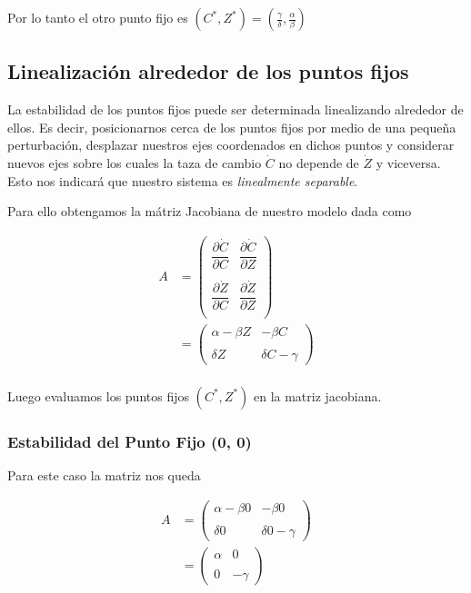 \documentclass[10pt,journal,compsoc]{IEEEtran}
\begin{document}
 Por lo tanto el otro punto fijo es $(C^{*}, Z^{*}) = (\frac{\gamma}{\delta},
 \frac{\alpha}{\beta})$

 \subsection{Linealización alrededor de los puntos fijos}

 La estabilidad de los puntos fijos puede ser determinada linealizando alrededor
 de ellos. Es decir, posicionarnos cerca de los puntos fijos por medio de una
 pequeña perturbación, desplazar nuestros ejes coordenados en dichos puntos y
 considerar nuevos ejes sobre los cuales la taza de cambio $\dot C$ no depende
 de $\dot Z$ y viceversa. Esto nos indicará que nuestro sistema es
 \textit{linealmente separable}.

 Para ello obtengamos la mátriz Jacobiana de nuestro modelo dada como

 \begin{equation*}
  \begin{aligned}
  A &= 
    \begin{pmatrix}
      \dfrac{\partial \dot C}{\partial C} & \dfrac{\partial \dot C}{\partial Z}\\
      & \\
      \dfrac{\partial \dot Z}{\partial C} & \dfrac{\partial \dot Z}{\partial Z} \\
    \end{pmatrix} \\
    &= \begin{pmatrix}
      \alpha - \beta Z & -\beta C\\
      & \\
      \delta Z & \delta C - \gamma
    \end{pmatrix} \\
  \end{aligned}
 \end{equation*}
 
 Luego evaluamos los puntos fijos $(C^{*}, Z^{*})$ en la matriz jacobiana.

 \subsubsection{Estabilidad del Punto Fijo (0, 0)}

 Para este caso la matriz nos queda
 
 \begin{equation*}
  \begin{aligned}
  A &= \begin{pmatrix}
      \alpha - \beta 0 & -\beta 0\\
      & \\
      \delta 0 & \delta 0 - \gamma
    \end{pmatrix} \\
    &= \begin{pmatrix}
      \alpha & 0 \\
      & \\
      0 & -\gamma
    \end{pmatrix} \\
  \end{aligned}
 \end{equation*}
\end{document}
